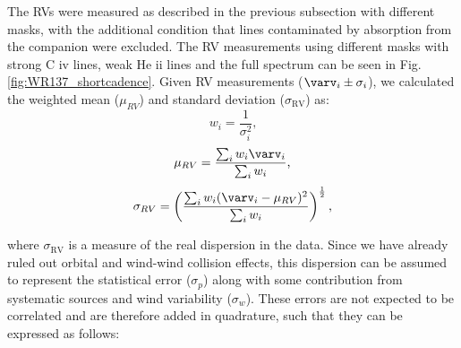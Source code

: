 The RVs were measured as described in the previous subsection with different masks, with the additional condition that lines contaminated by absorption from the companion were excluded. The RV measurements using different masks with strong C {\sc iv} lines, weak He {\sc ii} lines and the full spectrum can be seen in Fig. \ref{fig:WR137_shortcadence}. Given RV measurements ($\varv_i \pm \sigma_i$), we calculated the weighted mean ($\mu_{RV}$) and standard deviation ($\sigma_\textrm{RV}$) as:
\begin{equation}
w_i = \frac{1}{\sigma_i^2}  \textrm{,}
\end{equation}
\begin{equation}
\mu_{RV} =  \frac{\sum_i w_i \varv_i}{\sum_i w_i} \textrm{,}
\end{equation}
\begin{equation}
\sigma_{RV} = \left( \frac{\sum_i w_i (\varv_i - \mu_{RV})^2}{\sum_i w_i} \right )^{\frac{1}{2}} \textrm{,}
\end{equation}

where $\sigma_\textrm{RV}$ is a measure of the real dispersion in the data. Since we have already ruled out orbital and wind-wind collision effects, this dispersion can be assumed to represent the statistical error ($\sigma_p$) along with some contribution from systematic sources and wind variability ($\sigma_w$). These errors are not expected to be correlated and are therefore added in quadrature, such that they can be expressed as follows:

